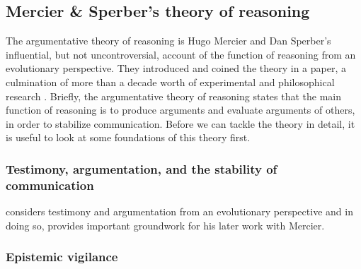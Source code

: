 \subsection{Mercier \& Sperber's theory of reasoning}


The argumentative theory of reasoning is Hugo Mercier and Dan Sperber's influential, but not uncontroversial, account of the function of reasoning from an evolutionary perspective. They introduced and coined the theory in a \citeyear{MS11} paper, a culmination of more than a decade worth of experimental and philosophical research \citep{Sperber01, Sperber10, Mercier09, Sperber00}.
Briefly, the argumentative theory of reasoning states that the main function of reasoning is to produce arguments and evaluate arguments of others, in order to stabilize communication.
Before we can tackle the theory in detail, it is useful to look at some foundations of this theory first.

\subsubsection{Testimony, argumentation, and the stability of communication}

\citet{Sperber01} considers testimony and argumentation from an evolutionary perspective and in doing so, provides important groundwork for his later work with Mercier.


\subsubsection{Epistemic vigilance}

